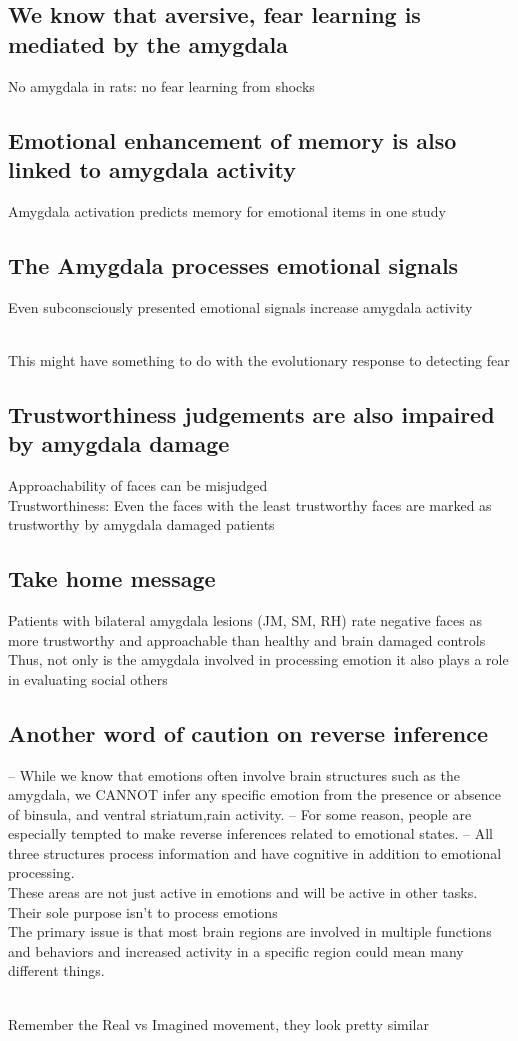 \subsection{We know that aversive, fear learning is mediated by the amygdala}
No amygdala in rats: no fear learning from shocks
\subsection{Emotional enhancement of memory is also linked to amygdala activity}
Amygdala activation predicts memory for emotional items in one study

\subsection{The Amygdala processes emotional signals}
Even subconsciously presented emotional signals increase amygdala activity

\\This might have something to do with the evolutionary response to detecting fear

\subsection{Trustworthiness judgements are also impaired by amygdala damage}
Approachability of faces can be misjudged
\\Trustworthiness: Even the faces with the least trustworthy faces are marked as trustworthy by amygdala damaged patients

\subsection{Take home message}Patients with bilateral amygdala lesions
(JM, SM, RH) rate negative faces as
more trustworthy and approachable than
healthy and brain damaged controls
\\Thus, not only is the amygdala involved
in processing emotion it also plays a role
in evaluating social others
\subsection{Another word of caution on reverse inference}
– While we know that emotions often involve brain structures such as the amygdala, we CANNOT
infer any specific emotion from the presence or absence of binsula, and ventral striatum,rain
activity.
– For some reason, people are especially tempted to make reverse inferences related to
emotional states.
– All three structures process information and have cognitive in addition to emotional processing.
\\These areas are not just active in emotions and will be active in other tasks. Their sole purpose isn't to process emotions
\\ The primary issue is that most brain regions are involved in multiple functions and
behaviors and increased activity in a specific region could mean many different
things.

\\Remember the Real vs Imagined movement, they look pretty similar
